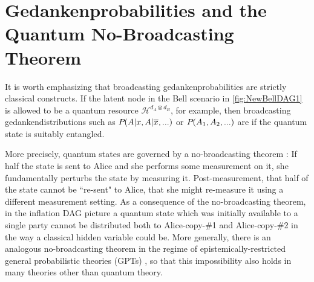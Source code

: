 {

\section{Gedankenprobabilities and the Quantum No-Broadcasting Theorem}\label{sec:classicallity}

It is worth emphasizing that broadcasting gedankenprobabilities %
are strictly classical constructs. If the latent node in the Bell scenario in \cref{fig:NewBellDAG1} is allowed to be a quantum resource $\mathcal{H}^{d_A\otimes d_B}$, for example, then broadcasting gedankendistributions such as ${P_{}}\lparen A|x , A|\overline{x},...\rparen$ or ${P_{}}\lparen A_1,A_2,...\rparen$ are  if the quantum state is suitably entangled.

More precisely, quantum states are governed by a no-broadcasting theorem \cite{NoCloningQuantum1996,NoCloningGeneral2006}: If half the state is sent to Alice and she performs some measurement on it, she fundamentally perturbs the state by measuring it. Post-measurement, that half of the state cannot be ``re-sent" to Alice, that she might re-measure it using a different measurement setting. As a consequence of the no-broadcasting theorem, in the inflation DAG picture a quantum state which was initially available to a single party cannot be distributed both to Alice-copy-\#1 and Alice-copy-\#2 in the way a classical hidden variable could be. More generally, there is an analogous no-broadcasting theorem in the regime of epistemically-restricted general probabilistic theories (GPTs) \cite{SpekkensToyTheory,NoCloningGeneral2006,Barnum2012GPT,Janotta2014GPT}, so that this impossibility also holds in many theories other than quantum theory.

}
